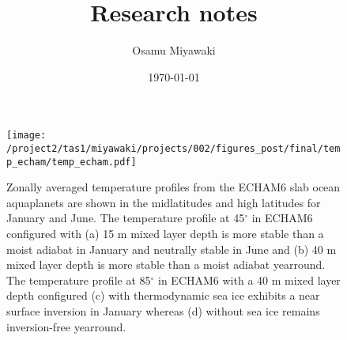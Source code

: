 \documentclass{article}
\title{Research notes}
\date{\today}
\author{Osamu Miyawaki}
\begin{document}
\maketitle

\begin{figure}
    \texttt{[image: /project2/tas1/miyawaki/projects/002/figures\_post/final/temp\_echam/temp\_echam.pdf]}
    \caption{Zonally averaged temperature profiles from the ECHAM6 slab ocean aquaplanets are shown in the midlatitudes and high latitudes for January and June. The temperature profile at 45$^\circ$ in ECHAM6 configured with (a) 15 m mixed layer depth is more stable than a moist adiabat in January and neutrally stable in June and (b) 40 m mixed layer depth is more stable than a moist adiabat yearround. The temperature profile at 85$^\circ$ in ECHAM6 with a 40 m mixed layer depth configured (c) with thermodynamic sea ice exhibits a near surface inversion in January whereas (d) without sea ice remains inversion-free yearround.}
    \label{fig:temp-echam}
\end{figure}



\end{document}
